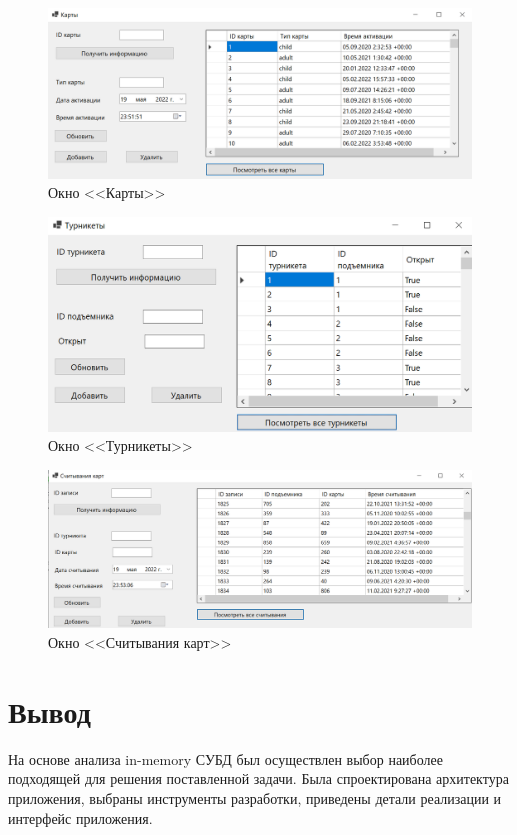 \begin{figure}[h!]
	\begin{center}
		\includegraphics[scale=0.6]{../imgs/int/cards.png}
	\end{center}
	\captionsetup{justification=centering}
	\caption{Окно <<Карты>>}
	\label{img:cards}
\end{figure}

\begin{figure}[h!]
	\begin{center}
		\includegraphics[scale=0.6]{../imgs/int/turnstiles.png}
	\end{center}
	\captionsetup{justification=centering}
	\caption{Окно <<Турникеты>>}
	\label{img:turnstiles}
\end{figure}

\begin{figure}[h!]
	\begin{center}
		\includegraphics[scale=0.6]{../imgs/int/readings.png}
	\end{center}
	\captionsetup{justification=centering}
	\caption{Окно <<Считывания карт>>}
	\label{img:readings}
\end{figure}

\clearpage
\section*{Вывод}

На основе анализа in-memory СУБД был осуществлен выбор наиболее подходящей для решения поставленной задачи. Была спроектирована архитектура приложения, выбраны инструменты разработки, приведены детали реализации и интерфейс приложения.